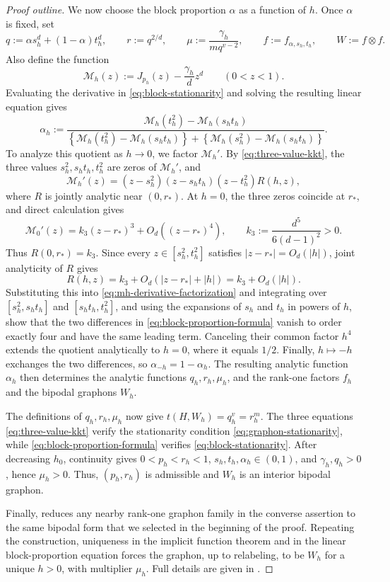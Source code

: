 \begin{proof}[Proof outline]
We now choose the block proportion $\alpha$ as a function of $h$.
Once $\alpha$ is fixed, set
\[
  q:=\alpha s_h^d+(1-\alpha)t_h^d,
  \qquad
  r:=q^{2/d},
  \qquad
  \mu:=\frac{\gamma_h}{m q^{v-2}},
  \qquad
  f:=f_{\alpha,s_h,t_h},
  \qquad
  W:=f\otimes f.
\]
Also define the function
\[
  \mathcal M_h(z):=J_{p_h}(z)-\frac{\gamma_h}{d}z^d
  \qquad (0 < z < 1).
\]
Evaluating the derivative in \eqref{eq:block-stationarity} and
solving the resulting linear equation gives
\begin{equation}\label{eq:block-proportion-formula}
  \alpha_h:=
  \frac{\mathcal M_h(t_h^2)-\mathcal M_h(s_ht_h)}
  {\left\{\mathcal M_h(t_h^2)-\mathcal M_h(s_ht_h)\right\}+
  \left\{\mathcal M_h(s_h^2)-\mathcal M_h(s_ht_h)\right\}}.
\end{equation}
To analyze this quotient as $h\to0$, we factor $\mathcal M_h'$.  By
\eqref{eq:three-value-kkt}, the three values
$s_h^2,s_ht_h,t_h^2$ are zeros of $\mathcal M_h'$, and
\begin{equation}\label{eq:mh-derivative-factorization}
  \mathcal M_h'(z)
  =(z-s_h^2)(z-s_ht_h)(z-t_h^2)R(h,z),
\end{equation}
where $R$ is jointly analytic near $(0,r_*)$.
At $h=0$, the three zeros coincide at $r_*$, and direct calculation gives
\[
  \mathcal M_0'(z)
  =k_3(z-r_*)^3+O_d((z-r_*)^4),
  \qquad
  k_3:=\frac{d^5}{6(d-1)^2}>0.
\]
Thus $R(0,r_*)=k_3$.  Since every $z\in[s_h^2,t_h^2]$ satisfies
$|z-r_*|=O_d(|h|)$, joint analyticity of $R$ gives
\[
  R(h,z)=k_3+O_d(|z-r_*|+|h|)=k_3+O_d(|h|).
\]
Substituting this into \eqref{eq:mh-derivative-factorization}
and integrating over $[s_h^2,s_ht_h]$ and $[s_ht_h,t_h^2]$,
and using the expansions of $s_h$ and $t_h$ in powers of $h$,
show that the two differences in \eqref{eq:block-proportion-formula} vanish to order exactly four
and have the same leading term.  Canceling their common factor $h^4$ extends
the quotient analytically to $h=0$, where it equals $1/2$.  Finally,
$h\mapsto-h$ exchanges the two differences, so
$\alpha_{-h}=1-\alpha_h$.  The resulting analytic function $\alpha_h$ then
determines the analytic functions $q_h,r_h,\mu_h$, and the rank-one
factors $f_h$ and the bipodal graphons $W_h$.

The definitions of $q_h,r_h,\mu_h$ now give
$t(H,W_h)=q_h^v=r_h^m$.  The three equations
\eqref{eq:three-value-kkt} verify the stationarity condition
\eqref{eq:graphon-stationarity}, while
\eqref{eq:block-proportion-formula} verifies
\eqref{eq:block-stationarity}.
After decreasing $h_0$, continuity gives $0<p_h<r_h<1$,
$s_h,t_h,\alpha_h\in(0,1)$, and $\gamma_h,q_h>0$, hence $\mu_h>0$.
Thus, $(p_h,r_h)$ is admissible and $W_h$ is an interior bipodal graphon.

Finally,  reduces any nearby rank-one graphon family in the
converse assertion to the same bipodal form that we selected in the beginning of the proof.
Repeating the construction, uniqueness in the implicit function theorem and in the linear
block-proportion equation forces the graphon, up to relabeling, to be
$W_h$ for a unique $h>0$, with multiplier $\mu_h$.
Full details are given in
.
\end{proof}

